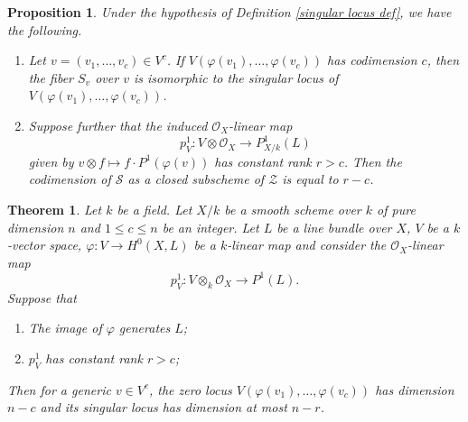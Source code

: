 \documentclass[10pt,a4paper]{amsart}
\newtheorem{proposition}{Proposition}
\newtheorem{theorem}{Theorem}
\renewcommand{\leq}{\leqslant}
\begin{document}
\begin{proposition}\label{singular locus prop}
Under the hypothesis of Definition \ref{singular locus def}, we have the following.
    \begin{enumerate}
        \item Let $v=(v_{1},\dots, v_{c})\in V^{c}$. If $V(\varphi(v_{1}),\dots, \varphi(v_{c}))$ has codimension $c$, then the fiber $S_{v}$ over $v$ is isomorphic to the singular locus of $V(\varphi(v_{1}),\dots, \varphi(v_{c}))$.
        \item Suppose further that the induced $\mathcal{O}_{X}$-linear map
        \[
        p^{1}_{V}\colon V\otimes \mathcal{O}_{X}\to P^{1}_{X/k}(L)
        \]
        given by $v\otimes f\mapsto f\cdot P^{1}(\varphi(v))$ has constant rank $r>c$. Then the codimension of $\mathcal{S}$ as a closed subscheme of $\mathcal{Z}$ is equal to $r-c$.
    \end{enumerate}
\end{proposition}

\begin{theorem}\label{Bertini}
    Let $k$ be a field. Let $X/k$ be a smooth scheme over $k$ of pure dimension $n$ and $1\leq c\leq n$ be an integer. Let $L$ be a line bundle over $X$, $V$ be a $k$-vector space, $\varphi\colon V\to H^{0}(X,L)$ be a $k$-linear map and consider the $\mathcal{O}_{X}$-linear map
    \[
    p^{1}_{V}\colon V\otimes_{k}\mathcal{O}_{X}\to P^{1}(L).
    \]
    Suppose that
    \begin{enumerate}
        \item The image of $\varphi$ generates $L$;
        \item $p^{1}_{V}$ has constant rank $r>c$;
    \end{enumerate}
    Then for a generic $v\in V^{c}$, the zero locus $V(\varphi(v_{1}),\dots, \varphi(v_{c}))$ has dimension $n-c$ and its singular locus has dimension at most $n-r$.
\end{theorem}
\end{document}
